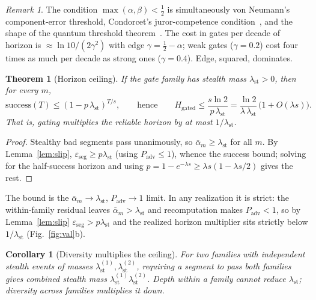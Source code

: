 \documentclass[11pt]{article}
\newtheorem{theorem}{Theorem}
\newtheorem{corollary}{Corollary}
\theoremstyle{remark}
\newtheorem{remark}{Remark}
\newcommand{\lst}{\lambda_{\mathrm{st}}}
\newcommand{\Padv}{P_{\mathrm{adv}}}
\newcommand{\eseg}{\varepsilon_{\mathrm{seg}}}
\newcommand{\am}{\bar\alpha_m}
\newcommand{\Hgated}{H_{\mathrm{gated}}}
\begin{document}
\begin{remark}\label{rem:threshold}
The condition $\max(\alpha,\beta)<\tfrac12$ is simultaneously von Neumann's component-error
threshold, Condorcet's juror-competence condition~\cite{condorcet1785}, and the shape of the
quantum threshold theorem~\cite{aharonov1997}.
The cost in gates per decade of horizon is
$\approx\ln 10/(2\gamma^2)$ with edge $\gamma=\tfrac12-\alpha$;
weak gates ($\gamma=0.2$) cost
four times as much per decade as strong ones ($\gamma=0.4$). Edge, squared,
dominates.
\end{remark}

\begin{theorem}[Horizon ceiling]\label{thm:ceiling}
If the gate family has stealth mass $\lst>0$, then for every $m$,
\[
\mathrm{success}(T)\le(1-p\,\lst)^{T/s},
\qquad\text{hence}\qquad
\Hgated\le\frac{s\ln 2}{p\,\lst}=\frac{\ln 2}{\lambda\,\lst}\,\big(1+O(\lambda s)\big).
\]
That is, gating multiplies the reliable horizon by at most $1/\lst$.
\end{theorem}
\begin{proof}
Stealthy bad segments pass unanimously, so $\am\ge\lst$ for all $m$. By Lemma~\ref{lem:slip},
$\eseg\ge p\lst$ (using $\Padv\le 1$), whence the success bound;
solving for the half-success
horizon and using $p=1-e^{-\lambda s}\ge\lambda s(1-\lambda s/2)$ gives the rest.
\end{proof}

\noindent The bound is the $\am\to\lst$, $\Padv\to1$ limit. In any realization it is strict: the
within-family residual leaves $\am>\lst$ and recomputation makes $\Padv<1$, so by
Lemma~\ref{lem:slip} $\eseg>p\lst$ and the realized horizon multiplier sits strictly below
$1/\lst$ (Fig.~\ref{fig:val}b).

\begin{corollary}[Diversity multiplies the ceiling]\label{cor:diversity}
For two families with \emph{independent} stealth events of masses $\lst^{(1)},\lst^{(2)}$,
requiring a segment to pass both families gives combined stealth mass $\lst^{(1)}\lst^{(2)}$.
Depth
within a family cannot reduce $\lst$; diversity across families multiplies it down.
\end{corollary}
\end{document}
